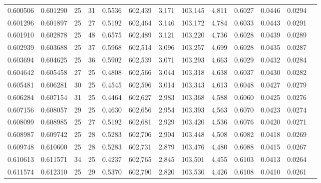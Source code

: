 \begin{tabular}{rrrrrrrrrrrrr}
0.600506 & 0.601290 &    25 &  31 &                                     0.5536 & 602,439 &   3,171 & 103,145 &   4,811 & 0.6027 & 0.0446 & 0.0294 \\
0.601296 & 0.601897 &    25 &  27 &                                     0.5192 & 602,464 &   3,146 & 103,172 &   4,784 & 0.6033 & 0.0443 & 0.0291 \\
0.601910 & 0.602878 &    25 &  48 &                                     0.6575 & 602,489 &   3,121 & 103,220 &   4,736 & 0.6028 & 0.0439 & 0.0289 \\
0.602939 & 0.603688 &    25 &  37 &                                     0.5968 & 602,514 &   3,096 & 103,257 &   4,699 & 0.6028 & 0.0435 & 0.0287 \\
0.603694 & 0.604625 &    25 &  36 &                                     0.5902 & 602,539 &   3,071 & 103,293 &   4,663 & 0.6029 & 0.0432 & 0.0284 \\
0.604642 & 0.605458 &    27 &  25 &                                     0.4808 & 602,566 &   3,044 & 103,318 &   4,638 & 0.6037 & 0.0430 & 0.0282 \\
0.605481 & 0.606281 &    30 &  25 &                                     0.4545 & 602,596 &   3,014 & 103,343 &   4,613 & 0.6048 & 0.0427 & 0.0279 \\
0.606284 & 0.607154 &    31 &  25 &                                     0.4464 & 602,627 &   2,983 & 103,368 &   4,588 & 0.6060 & 0.0425 & 0.0276 \\
0.607156 & 0.608057 &    29 &  25 &                                     0.4630 & 602,656 &   2,954 & 103,393 &   4,563 & 0.6070 & 0.0423 & 0.0274 \\
0.608099 & 0.608985 &    25 &  27 &                                     0.5192 & 602,681 &   2,929 & 103,420 &   4,536 & 0.6076 & 0.0420 & 0.0271 \\
0.608987 & 0.609742 &    25 &  28 &                                     0.5283 & 602,706 &   2,904 & 103,448 &   4,508 & 0.6082 & 0.0418 & 0.0269 \\
0.609748 & 0.610600 &    25 &  28 &                                     0.5283 & 602,731 &   2,879 & 103,476 &   4,480 & 0.6088 & 0.0415 & 0.0267 \\
0.610613 & 0.611571 &    34 &  25 &                                     0.4237 & 602,765 &   2,845 & 103,501 &   4,455 & 0.6103 & 0.0413 & 0.0264 \\
0.611574 & 0.612310 &    25 &  29 &                                     0.5370 & 602,790 &   2,820 & 103,530 &   4,426 & 0.6108 & 0.0410 & 0.0261 \\

\end{tabular}
